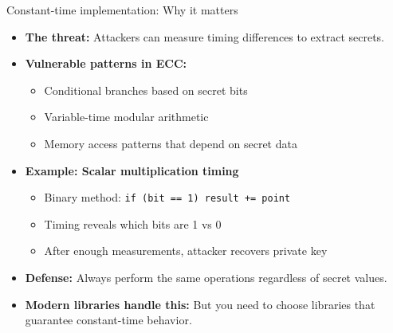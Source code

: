 \documentclass[aspectratio=169, lualatex, handout]{beamer}
\begin{document}
\begin{frame}{Constant-time implementation: Why it matters}
	\begin{itemize}[<+->]
		\item \textbf{The threat:} Attackers can measure timing differences to extract secrets.
		\item \textbf{Vulnerable patterns in ECC:}
		      \begin{itemize}
			      \item Conditional branches based on secret bits
			      \item Variable-time modular arithmetic
			      \item Memory access patterns that depend on secret data
		      \end{itemize}
		\item \textbf{Example: Scalar multiplication timing}
		      \begin{itemize}
			      \item Binary method: \texttt{if (bit == 1) result += point}
			      \item Timing reveals which bits are 1 vs 0
			      \item After enough measurements, attacker recovers private key
		      \end{itemize}
		\item \textbf{Defense:} Always perform the same operations regardless of secret values.
		\item \textbf{Modern libraries handle this:} But you need to choose libraries that guarantee constant-time behavior.
	\end{itemize}
\end{frame}
\end{document}
